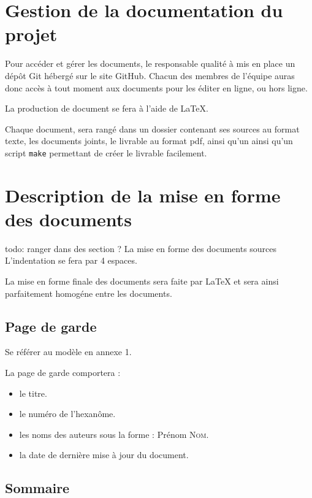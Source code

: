 \section{Gestion de la documentation du projet}

Pour accéder et gérer les documents, le responsable qualité à mis en place un dépôt Git hébergé sur le site GitHub.
Chacun des membres de l’équipe auras donc accès à tout moment aux documents pour les éditer en ligne, ou hors ligne.

La production de document se fera à l’aide de LaTeX.

Chaque document, sera rangé dans un dossier contenant ses sources au format texte, les documents joints, le livrable au format pdf, ainsi qu'un  ainsi qu'un script \texttt{make} permettant de créer le livrable facilement.

\section{Description de la mise en forme des documents}


\huge{todo: ranger dans des section ?}
La mise en forme des documents sources
L'indentation se fera par 4 espaces.

La mise en forme finale des documents sera faite par LaTeX et sera ainsi parfaitement homogéne entre les documents.


\subsection{Page de garde}
   Se référer au modèle en annexe 1.

   La page de garde comportera :
   \begin{itemize}
      \item le titre.
      \item le numéro de l'hexanôme.
      \item les noms des auteurs sous la forme : Prénom \textsc{Nom}.
      \item la date de dernière mise à jour du document.
   \end{itemize}

\subsection{Sommaire}
  
